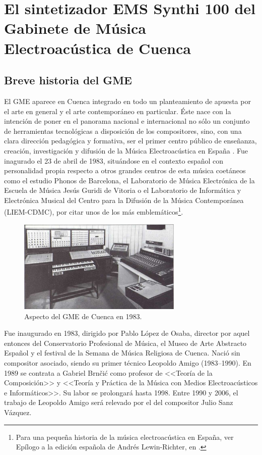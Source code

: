 \chapter[El Synthi 100 del GME de Cuenca]{El sintetizador EMS Synthi 100 del Gabinete de Música Electroacústica de Cuenca}


\section{Breve historia del GME}

El GME aparece en Cuenca integrado en todo un planteamiento de apuesta por el arte en general y el arte contemporáneo en particular. Éste nace con la intención de poner en el panorama nacional e internacional no sólo un conjunto de herramientas tecnológicas a disposición de los compositores, sino, con una clara dirección pedagógica y formativa, ser el primer centro público de enseñanza, creación, investigación y difusión de la Música Electroacústica en España \cite[p.~317]{GME}. Fue inagurado el 23 de abril de 1983, situándose en el contexto español con personalidad propia respecto a otros grandes centros de esta música coetáneos como el estudio Phonos de Barcelona, el Laboratorio de Música Electrónica de la Escuela de Música Jesús Guridi de Vitoria o el Laboratorio de Informática y Electrónica Musical del Centro para la Difusión de la Música Contemporánea (LIEM-CDMC), por citar unos de los más emblemáticos\footnote{Para una pequeña historia de la música electroacústica en España, ver Epílogo a la edición española de Andrés Lewin-Richter, en .}.

\begin{figure}
	\centering
	\includegraphics[width=0.7\textwidth]{GME_1984}
	\caption[Aspecto del GME de Cuenca en 1983.]{Aspecto del GME de Cuenca en 1983.}
	\label{fig:gme_1984}
\end{figure}

Fue inaugurado en 1983, dirigido por Pablo López de Osaba, director por aquel entonces del Conservatorio Profesional de Música, el Museo de Arte Abstracto Español y el festival de la Semana de Música Religiosa de Cuenca. Nació sin compositor asociado, siendo su primer técnico Leopoldo Amigo (1983--1990). En 1989 se contrata a Gabriel Brnčić como profesor de <<Teoría de la Composición>> y <<Teoría y Práctica de la Música con Medios Electroacústicos e Informáticos>>. Su labor se prolongará hasta 1998. Entre 1990 y 2006, el trabajo de Leopoldo Amigo será relevado por el del compositor Julio Sanz Vázquez. 

